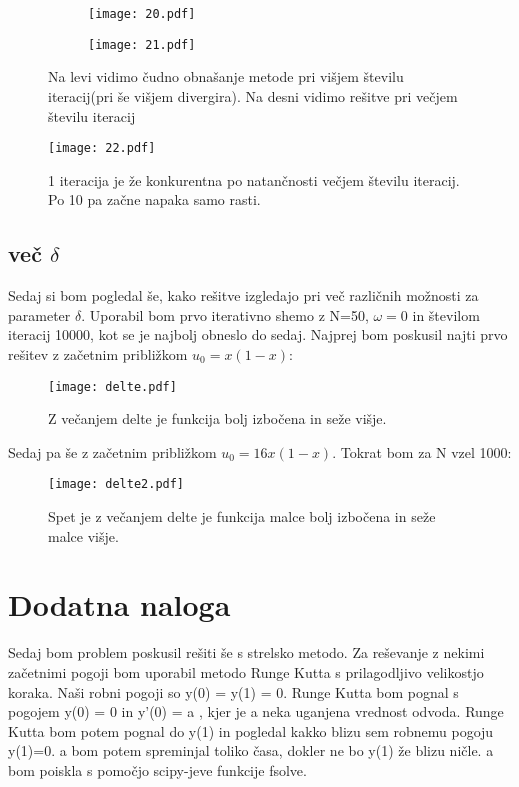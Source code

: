 \documentclass{article}
\begin{document}
\begin{figure}[H]
\begin{subfigure}{.5\textwidth}
\texttt{[image: 20.pdf]}
\end{subfigure}
\begin{subfigure}{.5\textwidth}
\texttt{[image: 21.pdf]}
\end{subfigure}
\caption*{Na levi vidimo čudno obnašanje metode pri višjem številu iteracij(pri še višjem divergira). Na desni vidimo rešitve pri večjem številu iteracij} 
\end{figure}

\begin{figure}[H]
\texttt{[image: 22.pdf]}
\caption*{1 iteracija je že konkurentna po natančnosti večjem številu iteracij. Po 10 pa začne napaka samo rasti.} 
\end{figure}
\newpage
\subsection{več $\delta$}

Sedaj si bom pogledal še, kako rešitve izgledajo pri več različnih možnosti za parameter $\delta$. Uporabil bom prvo iterativno shemo z N=50, $\omega=0$ in številom iteracij 10000, kot se je najbolj
obneslo do sedaj. Najprej bom poskusil najti prvo rešitev z začetnim približkom $u_0 = x(1-x)$:
\begin{figure}[H]
\texttt{[image: delte.pdf]}
\caption*{Z večanjem delte je funkcija bolj izbočena in seže višje.} 
\end{figure}
\newpage
Sedaj pa še z začetnim približkom $u_0 = 16x(1-x)$. Tokrat bom za N vzel 1000:

\begin{figure}[H]
\texttt{[image: delte2.pdf]}
\caption*{Spet je z večanjem delte je funkcija malce bolj izbočena in seže malce višje.} 
\end{figure}

\newpage
\section{Dodatna naloga}

Sedaj bom problem poskusil rešiti še s strelsko metodo.
Za reševanje z nekimi začetnimi pogoji bom uporabil metodo Runge Kutta s prilagodljivo velikostjo koraka.
Naši robni pogoji so y(0) = y(1) = 0.
Runge Kutta bom pognal s pogojem y(0) = 0 in y'(0) = a , kjer je a neka uganjena vrednost odvoda. 
Runge Kutta bom potem pognal do y(1) in pogledal kakko blizu sem robnemu pogoju y(1)=0. a bom potem spreminjal toliko časa,
dokler ne bo y(1) že blizu ničle. a bom poiskla s pomočjo scipy-jeve funkcije fsolve.
\end{document}
